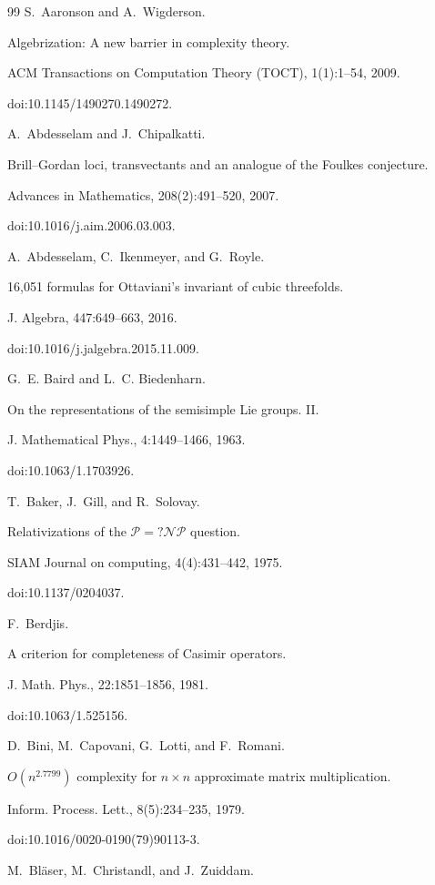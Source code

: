 \documentclass[10pt,a4paper]{article}
\begin{document}
\begin{thebibliography}{99}
S. Aaronson and A. Wigderson.


Algebrization: A new barrier in complexity theory.


ACM Transactions on Computation Theory (TOCT), 1(1):1–54,
2009.


doi:10.1145/1490270.1490272.

A. Abdesselam and J. Chipalkatti.


Brill–Gordan loci, transvectants and an analogue of the Foulkes
conjecture.


Advances in Mathematics, 208(2):491–520, 2007.


doi:10.1016/j.aim.2006.03.003.

A. Abdesselam, C. Ikenmeyer, and G. Royle.


16,051 formulas for Ottaviani’s invariant of cubic threefolds.


J. Algebra, 447:649–663, 2016.


doi:10.1016/j.jalgebra.2015.11.009.

G. E. Baird and L. C. Biedenharn.


On the representations of the semisimple Lie groups. II.


J. Mathematical Phys., 4:1449–1466, 1963.


doi:10.1063/1.1703926.

T. Baker, J. Gill, and R. Solovay.


Relativizations of the $\mathcal{P}=?\mathcal{NP}$ question.


SIAM Journal on computing, 4(4):431–442, 1975.


doi:10.1137/0204037.

F. Berdjis.


A criterion for completeness of Casimir operators.


J. Math. Phys., 22:1851–1856, 1981.


doi:10.1063/1.525156.

D. Bini, M. Capovani, G. Lotti, and F. Romani.


$O(n^{2.7799})$ complexity for $n\times{}n$ approximate matrix
multiplication.


Inform. Process. Lett., 8(5):234–235, 1979.


doi:10.1016/0020-0190(79)90113-3.

M. Bläser, M. Christandl, and J. Zuiddam.



\end{thebibliography}
\end{document}
